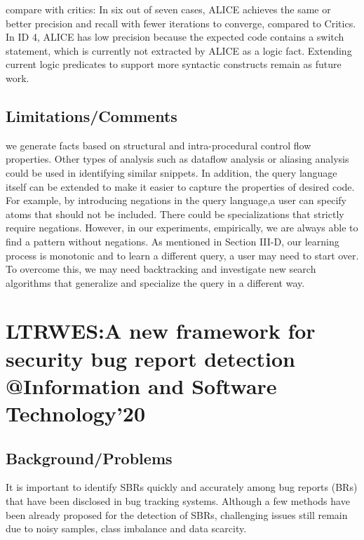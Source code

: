 compare with critics:
In six out of seven cases, ALICE achieves the same or better precision and recall with fewer iterations to converge, compared to Critics. In ID 4, ALICE has low precision because the expected code contains a switch statement, which is currently not extracted by ALICE as a logic fact. Extending current logic predicates to support more syntactic constructs remain as future work.
\subsection{Limitations/Comments}
we generate facts based on structural and intra-procedural control flow properties. Other types of analysis such as dataflow analysis or aliasing analysis could be used in identifying similar snippets. In addition, the query language itself can be extended to make it easier to capture the properties of desired code. For example, by introducing negations in the query language,a user can specify atoms that should not be included. There could be specializations that strictly require negations. However, in our experiments, empirically, we are always able to find a pattern without negations. As mentioned in Section III-D, our learning process is monotonic and to learn a different query, a user may need to start over. To overcome this, we may need backtracking and investigate new search algorithms that generalize and specialize the query in a different way.
\newpage

\section{LTRWES:A new framework for security bug report detection \\@Information and Software Technology'20}
\subsection{Background/Problems}
It is important to identify SBRs quickly and accurately among bug reports (BRs) that have been disclosed in bug tracking systems. Although a few methods have been already proposed for the detection of SBRs, challenging issues still remain due to noisy samples, class imbalance and data scarcity.
